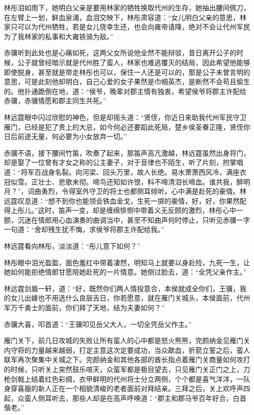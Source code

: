 林彤泪如雨下，她明白父亲是要用林家的牺牲换取代州的生存，她抽出腰间佩刀，在左臂上一划，鲜血泉涌，血泪交映下，林彤肃容道：“女儿明白父亲的意思，林家只可以为代州牺牲，若是女儿侥幸生还，也会向雍帝请降，绝对不会让代州军民为了我林家的私事和大雍铁骑为敌。”

赤骥听到此处也是心痛如死，这两父女所说他全然不能辩驳，昔日离开公子的时候，公子就曾经暗示就是代州胜了蛮人，林家也难逃覆灭的结局，因此希望他能够即使脱身，甚至就是带走林彤也可以，保住一人还是可以的，那是公子未曾言明的意思，可是此刻他却明白，自己心爱的女子果然是巾帼英杰，是断然不会苟且偷生的。他扑通跪倒在地，道：“侯爷，晚辈对郡主情有独衷，希望侯爷将郡主许配给赤骥，赤骥情愿和郡主同生共死。”

林远霆眼中闪过欣慰的神色，但是却摇头道：“贤侄，你近日来助我代州军民守卫雁门，已经是犯了贵上的大忌，如今何必还要蹈此死局，楚乡侯圣眷正隆，贤侄你日后前途无量，何必要为小女放弃一切。”

赤骥不语，接下腰间竹笛，吹奏了起来，那笛声高亢激越，林远霆虽然出身将门，却是娶了一位曾有才女之称的公主妻子，对于音律也不陌生，听了片刻，拊掌唱道：“将军百战身名裂。向河梁、回头万里，故人长绝。易水萧萧西风冷，满座衣冠似雪。正壮士、悲歌未彻。啼鸟还知如许恨，料不啼清泪长啼血。谁共我，醉明月？”，词曲勇烈，令得室外守卫的将士也都侧耳倾听，心中满是赴死的豪情。林远霆叹息道：“想不到你也能领会铁血金戈，生死一掷的豪情，好，好，你果然配得上彤儿。”这时，笛声一变，却是缠绵悱恻中带着义无反顾的激烈，林彤心中一颤，沉迷在情郎用心血演奏的曲调当中，甚至不知曲声何时停止，只听见赤骥一字一句道：“舍却残生犹不悔，求侯爷将郡主许配给我。”

林远霆看向林彤，淡淡道：“彤儿意下如何？”

林彤眼中泪光盈盈，面色羞红中带着凄然，明知马上就要以身赴险，九死一生，让她如何能拒绝情郎甘愿陪她赴死的一片情意。她侧过脸去，道：“全凭父亲作主。”

林远霆剑眉一轩，道：“好，既然你们两人情投意合，本侯就成全你们，王骥，我的女儿出嫁也不用选什么良辰吉日，你若愿意，就在雁门关城头，本侯面前，代州军万千勇士的面前，你们拜了天地，结为夫妻如何？”

赤骥大喜，叩首道：“王骥叩见岳父大人，一切全凭岳父作主。”

雁门关下，前几日攻城的失败让所有蛮人的心中都是怒火熊熊，完颜纳金见雁门关内守将的力量越来越弱，打定主意这次定要成功，当众歃血，折箭立誓之后，蛮人联军再次聚集中关城之下。完颜纳金和其他各部的酋长指点着雁门关商量如何攻打的时候，只听关上突然鼓乐喧天，众蛮军都是极目望去，只见雁门关正门之上，刀枪剑戟上结着红色彩绸，衣甲鲜明的代州将士分立两侧，个个都是喜气洋洋，一队身穿喜服的新人正在一个相貌清峻的老者面前对拜结亲。三拜之后，关上欢呼声四起，众蛮人侧耳听去，那些人却是在高声呼唤道：“郡主和郡马爷百年好合，白首偕老。”

